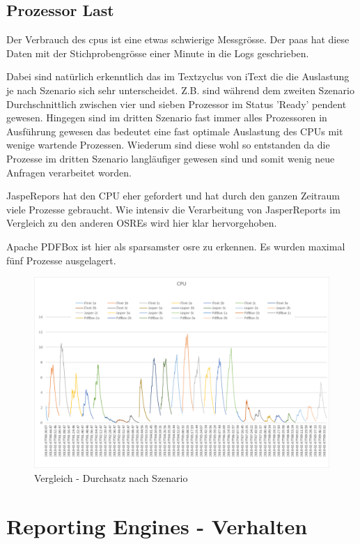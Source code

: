 \documentclass[main.tex]{subfiles}
\begin{document}
\subsection{Prozessor Last}
Der Verbrauch des \acrlong{cpu}s ist eine etwas schwierige Messgrösse. Der \acrlong{paas} hat diese Daten mit der Stichprobengrösse einer Minute in die Logs geschrieben.

Dabei sind natürlich erkenntlich das im Textzyclus von iText die die Auslastung je nach Szenario sich sehr unterscheidet. Z.B. sind während dem zweiten Szenario Durchschnittlich  zwischen vier und sieben Prozessor im Status 'Ready' pendent gewesen. Hingegen sind im dritten Szenario fast immer alles Prozessoren in Ausführung gewesen das bedeutet eine fast optimale Auslastung des CPUs mit wenige wartende Prozessen. Wiederum sind diese wohl so entstanden da die Prozesse im dritten Szenario langläufiger gewesen sind und somit wenig neue Anfragen verarbeitet worden. 

JaspeRepors hat den CPU eher gefordert und hat durch den ganzen Zeitraum viele Prozesse gebraucht. Wie intensiv die Verarbeitung von JasperReports im Vergleich zu den anderen OSREs wird hier klar hervorgehoben. 

Apache PDFBox ist hier als sparsamster \acrlong{osre} zu erkennen. Es wurden maximal fünf Prozesse ausgelagert. 
\begin{figure}[!hb]
\includegraphics[width=\textwidth]{mainpart/4_analyse_img/CPUVergleich.png}
 \caption{Vergleich - Durchsatz nach Szenario}
 \label{figure:cpuVergleich}
\end{figure}




\section{Reporting Engines - Verhalten}
\end{document}
